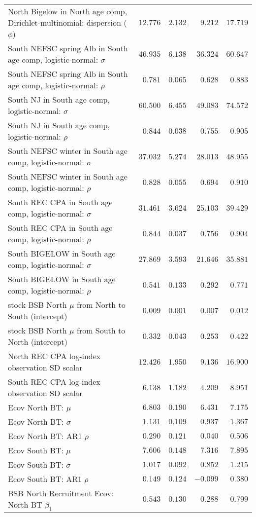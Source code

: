 \documentclass[
]{article}
\begin{document}
\begin{landscape}
\begin{longtable}[t]{lrrrr}
North Bigelow in North age comp, Dirichlet-multinomial: dispersion ($\phi$) & $12.776$ & $2.132$ & $9.212$ & $17.719$\\
South NEFSC spring Alb in South age comp, logistic-normal: $\sigma$ & $46.935$ & $6.138$ & $36.324$ & $60.647$\\
South NEFSC spring Alb in South age comp, logistic-normal: $\rho$ & $0.781$ & $0.065$ & $0.628$ & $0.883$\\
\addlinespace
South NJ in South age comp, logistic-normal: $\sigma$ & $60.500$ & $6.455$ & $49.083$ & $74.572$\\
South NJ in South age comp, logistic-normal: $\rho$ & $0.844$ & $0.038$ & $0.755$ & $0.905$\\
South NEFSC winter in South age comp, logistic-normal: $\sigma$ & $37.032$ & $5.274$ & $28.013$ & $48.955$\\
South NEFSC winter in South age comp, logistic-normal: $\rho$ & $0.828$ & $0.055$ & $0.694$ & $0.910$\\
South REC CPA in South age comp, logistic-normal: $\sigma$ & $31.461$ & $3.624$ & $25.103$ & $39.429$\\
\addlinespace
South REC CPA in South age comp, logistic-normal: $\rho$ & $0.844$ & $0.037$ & $0.756$ & $0.904$\\
South BIGELOW in South age comp, logistic-normal: $\sigma$ & $27.869$ & $3.593$ & $21.646$ & $35.881$\\
South BIGELOW in South age comp, logistic-normal: $\rho$ & $0.541$ & $0.133$ & $0.292$ & $0.771$\\
stock BSB North $\mu$ from North to South (intercept) & $0.009$ & $0.001$ & $0.007$ & $0.012$\\
stock BSB North $\mu$ from South to North (intercept) & $0.332$ & $0.043$ & $0.253$ & $0.422$\\
\addlinespace
North REC CPA log-index observation SD scalar & $12.426$ & $1.950$ & $9.136$ & $16.900$\\
South REC CPA log-index observation SD scalar & $6.138$ & $1.182$ & $4.209$ & $8.951$\\
Ecov North BT: $\mu$ & $6.803$ & $0.190$ & $6.431$ & $7.175$\\
Ecov North BT: $\sigma$ & $1.131$ & $0.109$ & $0.937$ & $1.367$\\
Ecov North BT: AR1 $\rho$ & $0.290$ & $0.121$ & $0.040$ & $0.506$\\
\addlinespace
Ecov South BT: $\mu$ & $7.606$ & $0.148$ & $7.316$ & $7.895$\\
Ecov South BT: $\sigma$ & $1.017$ & $0.092$ & $0.852$ & $1.215$\\
Ecov South BT: AR1 $\rho$ & $0.149$ & $0.124$ & $-0.099$ & $0.380$\\
BSB North Recruitment Ecov: North BT $\beta_1$ & $0.543$ & $0.130$ & $0.288$ & $0.799$\\*
\end{longtable}
\end{landscape}
\end{document}
